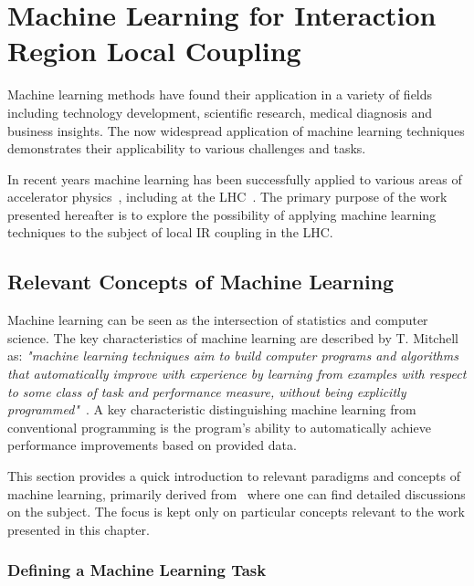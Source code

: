 \chapter{Machine Learning for Interaction Region Local Coupling}
\label{chapter:ml_local_coupling}

Machine learning methods have found their application in a variety of fields including technology development, scientific research, medical diagnosis and business insights.
The now widespread application of machine learning techniques demonstrates their applicability to various challenges and tasks.

In recent years machine learning has been successfully applied to various areas of accelerator physics~\cite{}, including at the LHC~\cite{PRAB:Fol:Detection_Faulty_BPMs,EPJP:Fol:Supervised_Learning_Reconstruction_Magnet_Errors,PHD:Fol:Application_ML_Beam_Optics}.
The primary purpose of the work presented hereafter is to explore the possibility of applying machine learning techniques to the subject of local IR coupling in the LHC.

\section{Relevant Concepts of Machine Learning}
\label{section:concepts_of_machine_learning}

Machine learning can be seen as the intersection of statistics and computer science.
The key characteristics of machine learning are described by T. Mitchell as: \textit{"machine learning techniques aim to build computer programs and algorithms that automatically improve with experience by learning from examples with respect to some class of task and performance measure, without being explicitly programmed"}~\cite{BOOK:Mitchell:Machine_Learning}.
A key characteristic distinguishing machine learning from conventional programming is the program's ability to automatically achieve performance improvements based on provided data.

This section provides a quick introduction to relevant paradigms and concepts of machine learning, primarily derived from~\cite{BOOK:Mitchell:Machine_Learning,BOOK:Hastie:Elements_Statistical_Learning} where one can find detailed discussions on the subject.
The focus is kept only on particular concepts relevant to the work presented in this chapter.

\subsection{Defining a Machine Learning Task}

